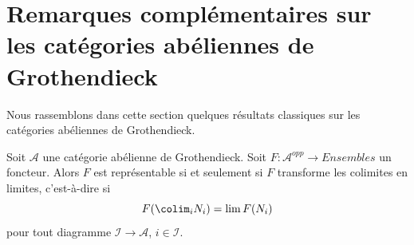 






\section{Remarques complémentaires sur les catégories abéliennes de
Grothendieck}
\label{section-additional-Grothendieck}

\noindent
Nous rassemblons dans cette section quelques résultats classiques sur les
catégories abéliennes de Grothendieck.

\begin{lemma}
\label{lemma-grothendieck-brown}
Soit $\mathcal{A}$ une catégorie abélienne de Grothendieck.
Soit $F : \mathcal{A}^{opp} \to \textit{Ensembles}$ un foncteur.
Alors $F$ est représentable si et seulement si $F$ transforme les colimites
en limites, c'est-à-dire si
$$
F(\colim_i N_i) = \lim F(N_i)
$$
pour tout diagramme $\mathcal{I} \to \mathcal{A}$, $i \in \mathcal{I}$.
\end{lemma}

